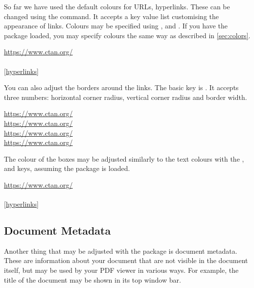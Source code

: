 So far we have used the default colours for URLs, hyperlinks. These can be
changed using the  command. It accepts a key value list
customising the appearance of links. Colours may be specified using
,  and . If you have the
 package loaded, you may specify colours the same way as described
in \autoref{sec:colors}.
\begin{chktexignore}
\begin{example}
\hypersetup{
  urlcolor = pink,
  citecolor = purple,
  linkcolor = teal!50!yellow,
}
\url{https://www.ctan.org/} \\
\cite{pack:hyperref} \\
\autoref{hyperlinks}
\end{example}
\end{chktexignore}

You can also adjust the borders around the links. The basic key is
. It accepts three numbers: horizontal corner radius, vertical
corner radius and border width.
\begin{example}
\hypersetup{pdfborder = 0 0 1}
\url{https://www.ctan.org/} \\
\hypersetup{pdfborder = 10 10 3}
\url{https://www.ctan.org/} \\
\hypersetup{pdfborder = 10 5 2}
\url{https://www.ctan.org/} \\
\hypersetup{pdfborder = 2 7 5}
\url{https://www.ctan.org/}
\end{example}
The colour of the boxes may be adjusted similarly to the text colours with the
,  and 
keys, assuming the  package is loaded.
\begin{chktexignore}
  \begin{example}
\hypersetup{
  pdfborder = 0 0 2,
  urlbordercolor = violet,
  citebordercolor = pink,
  linkbordercolor = teal,
}
\url{https://www.ctan.org/} \\
\cite{pack:hyperref} \\
\autoref{hyperlinks}
\end{example}
\end{chktexignore}

\subsection{Document Metadata}\label{sec:pdfmeta}

Another thing that may be adjusted with the  package is document
metadata. These are information about your document that are not visible in the
document itself, but may be used by your PDF viewer in various ways. For
example, the title of the document may be shown in its top window bar.

